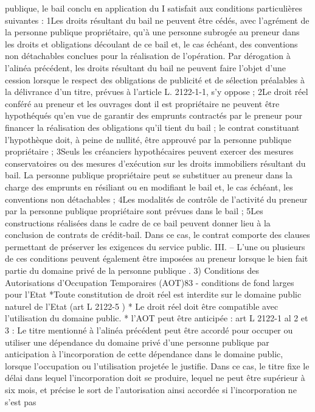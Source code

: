 \documentclass[11pt,a4paper]{report}
\begin{document}
publique, le bail conclu en application du I satisfait aux conditions particulières suivantes :
1\degre  Les droits résultant du bail ne peuvent être cédés, avec l'agrément de la personne publique
propriétaire, qu'à une personne subrogée au preneur dans les droits et obligations découlant de ce
bail et, le cas échéant, des conventions non détachables conclues pour la réalisation de l'opération.
Par dérogation à l'alinéa précédent, les droits résultant du bail ne peuvent faire l'objet d'une cession
lorsque le respect des obligations de publicité et de sélection préalables à la délivrance d'un titre,
prévues à l'article L. 2122-1-1, s'y oppose ;
2\degre  Le droit réel conféré au preneur et les ouvrages dont il est propriétaire ne peuvent être
hypothéqués qu'en vue de garantir des emprunts contractés par le preneur pour financer la réalisation
des obligations qu'il tient du bail ; le contrat constituant l'hypothèque doit, à peine de nullité, être
approuvé par la personne publique propriétaire ;
3\degre  Seuls les créanciers hypothécaires peuvent exercer des mesures conservatoires ou des mesures
d'exécution sur les droits immobiliers résultant du bail. La personne publique propriétaire peut se
substituer au preneur dans la charge des emprunts en résiliant ou en modifiant le bail et, le cas
échéant, les conventions non détachables ;
4\degre  Les modalités de contrôle de l'activité du preneur par la personne publique propriétaire sont
prévues dans le bail ;
5\degre  Les constructions réalisées dans le cadre de ce bail peuvent donner lieu à la conclusion de contrats
de crédit-bail. Dans ce cas, le contrat comporte des clauses permettant de préserver les exigences du
service public.
III. – L'une ou plusieurs de ces conditions peuvent également être imposées au preneur lorsque le bien
fait partie du domaine privé de la personne publique .
3\degre ) Conditions des Autorisations d’Occupation Temporaires (AOT)83
- conditions de fond larges pour l’Etat
*Toute constitution de droit réel est interdite sur le domaine public naturel de l’Etat (art L 2122-5 )
* Le droit réel doit être compatible avec l’utilisation du domaine public.
* l’AOT peut être anticipée : art L 2122-1 al 2 et 3 : Le titre mentionné à l'alinéa précédent peut être
accordé pour occuper ou utiliser une dépendance du domaine privé d'une personne publique par
anticipation à l'incorporation de cette dépendance dans le domaine public, lorsque l'occupation ou
l'utilisation projetée le justifie.
Dans ce cas, le titre fixe le délai dans lequel l'incorporation doit se produire, lequel ne peut être
supérieur à six mois, et précise le sort de l'autorisation ainsi accordée si l'incorporation ne s'est pas
\end{document}
